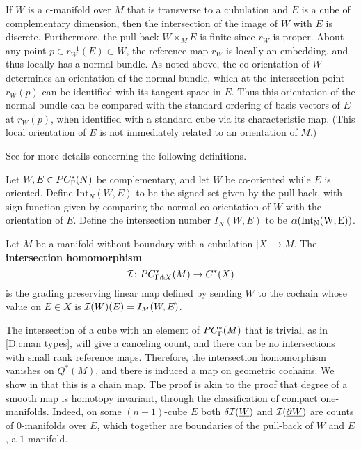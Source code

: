 If $W$ is a c-manifold over $M$ that is transverse to a cubulation and $E$ is a cube of complementary dimension, then the intersection of the image of $W$ with $E$ is discrete.
Furthermore, the pull-back $W \times_M E$ is finite since $r_W$ is proper.
About any point $p \in r_W^{-1}(E) \subset W$, the reference map $r_W$ is locally an embedding, and thus locally has a normal bundle.
As noted above, the co-orientation of $W$ determines an orientation of the normal bundle, which at the intersection point $r_W(p)$ can be identified with its tangent space in $E$.
Thus this orientation of the normal bundle can be compared with the standard ordering of basis vectors of $E$ at $r_W(p)$, when identified with a standard cube via its characteristic map.
(This local orientation of $E$ is not immediately related to an orientation of $M$.)

See \cite[Section 6.5]{medina2022foundations} for more details concerning the following definitions.

\begin{definition}\label{D:intersection number}
	Let $W, E \in PC_\Gamma^*({N})$ be complementary, and let $W$ be co-oriented while $E$ is oriented. Define $\mathrm{Int}_N(W, E)$ to be the signed set given
	by the pull-back, with sign function given by comparing the normal co-orientation of $W$ with the orientation of $E$.
	Define the intersection number $I_N(W,E)$ to be $\alpha(\rm{Int}_N(W, E))$.
\end{definition}

\begin{definition}\label{D:intersection homomorphism}
	Let $M$ be a manifold without boundary with a cubulation $|X| \to M$.
	The \textbf{intersection homomorphism}
	\begin{equation*}
		\mathcal{I} \colon PC^*_{\Gamma \pitchfork X}(M) \to C^{\ast}(X)
	\end{equation*}
	is the grading preserving linear map defined by sending $W$ to the cochain whose value on $E \in X$ is $\mathcal{I}(W)(E) = I_M(W, E)$.
\end{definition}

The intersection of a cube with an element of $PC_\Gamma^*(M)$ that is trivial, as in \cref{D:cman types}, will give a canceling count, and there can be no intersections with small rank reference maps.
Therefore, the intersection homomorphism vanishes on $Q^*(M)$, and there is induced a map on geometric cochains.
We show in \cite[Proposition 6.14]{medina2022foundations} that this is a chain map.
The proof is akin to the proof that degree of a smooth map is homotopy invariant, through the classification of compact one-manifolds.
Indeed, on some $(n+1)$-cube $E$ both $\delta \mathcal{I}(\underline{W})$ and $\mathcal{I}(\underline{\partial W})$ are counts of $0$-manifolds over $E$, which together are boundaries of the pull-back of $W$ and $E$, a $1$-manifold.

